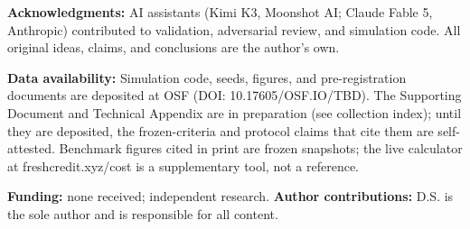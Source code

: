\documentclass[11pt,twocolumn]{article}
\begin{document}
\textbf{Acknowledgments:} AI assistants (Kimi K3, Moonshot AI; Claude
Fable 5, Anthropic) contributed to validation, adversarial
review, and simulation code. All original ideas, claims, and conclusions are
the author's own.

\textbf{Data availability:} Simulation code, seeds, figures, and pre-registration documents are deposited at OSF (DOI: 10.17605/OSF.IO/TBD). The Supporting Document and Technical Appendix are in preparation (see collection index); until they are deposited, the frozen-criteria and protocol claims that cite them are self-attested. Benchmark figures cited in print are frozen snapshots; the
live calculator at freshcredit.xyz/cost is a supplementary tool, not a
reference. 

\textbf{Funding:} none received; independent research. \textbf{Author
contributions:} D.S. is the sole author and is responsible for all
content.



\end{document}
